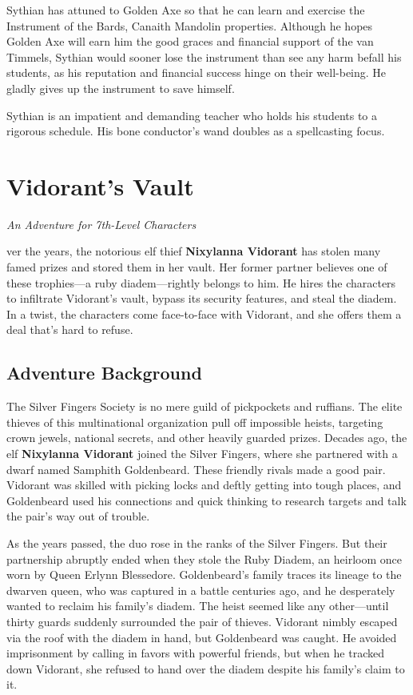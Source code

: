 \documentclass[10pt,a4paper,twoside,bg=print,twocolumn,openany,nodeprecatedcode]{dndbook}
\begin{document}
Sythian has attuned to Golden Axe so that he can learn and exercise the Instrument of the Bards, Canaith Mandolin properties. Although he hopes Golden Axe will earn him the good graces and financial support of the van Timmels, Sythian would sooner lose the instrument than see any harm befall his students, as his reputation and financial success hinge on their well-being. He gladly gives up the instrument to save himself.

Sythian is an impatient and demanding teacher who holds his students to a rigorous schedule. His bone conductor's wand doubles as a spellcasting focus.

\chapter{Vidorant's Vault}
\textit{An Adventure for 7th-Level Characters}

ver the years, the notorious elf thief \textbf{Nixylanna Vidorant} has stolen many famed prizes and stored them in her vault. Her former partner believes one of these trophies—a ruby diadem—rightly belongs to him. He hires the characters to infiltrate Vidorant's vault, bypass its security features, and steal the diadem. In a twist, the characters come face-to-face with Vidorant, and she offers them a deal that's hard to refuse.


\section{Adventure Background}
The Silver Fingers Society is no mere guild of pickpockets and ruffians. The elite thieves of this multinational organization pull off impossible heists, targeting crown jewels, national secrets, and other heavily guarded prizes. Decades ago, the elf \textbf{Nixylanna Vidorant} joined the Silver Fingers, where she partnered with a dwarf named Samphith Goldenbeard. These friendly rivals made a good pair. Vidorant was skilled with picking locks and deftly getting into tough places, and Goldenbeard used his connections and quick thinking to research targets and talk the pair's way out of trouble.

As the years passed, the duo rose in the ranks of the Silver Fingers. But their partnership abruptly ended when they stole the Ruby Diadem, an heirloom once worn by Queen Erlynn Blessedore. Goldenbeard's family traces its lineage to the dwarven queen, who was captured in a battle centuries ago, and he desperately wanted to reclaim his family's diadem. The heist seemed like any other—until thirty guards suddenly surrounded the pair of thieves. Vidorant nimbly escaped via the roof with the diadem in hand, but Goldenbeard was caught. He avoided imprisonment by calling in favors with powerful friends, but when he tracked down Vidorant, she refused to hand over the diadem despite his family's claim to it.
\end{document}
